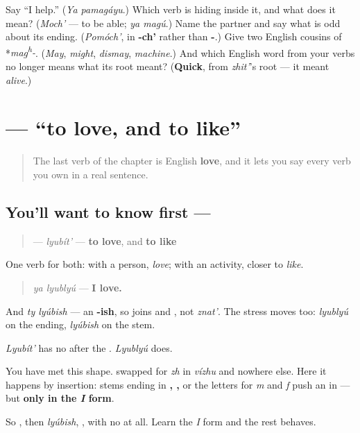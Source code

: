 \begin{tcolorbox}[breakable,colback=teal!4,colframe=teal!35!black,title={Before you move on}]
Say \textquotedblleft{}I help.\textquotedblright{} (\emph{Ya pamagáyu}.) Which verb is hiding inside it, and what does it mean? (\emph{Moch'} — to be able; \emph{ya magú}.) Name the partner and say what is odd about its ending. (\emph{Pomóch'}, in \textbf{-ch'} rather than \textbf{-}.) Give two English cousins of *\emph{mag\textsuperscript{h}-}. (\emph{May}, \emph{might}, \emph{dismay}, \emph{machine}.) And which English word from your verbs no longer means what its root meant? (\textbf{Quick}, from \emph{zhit'}'s root — it meant \emph{alive}.)
\end{tcolorbox}
\section[\texorpdfstring{\ru{любить} (lyubít')}{любить (lyubít')}]{ — \textquotedblleft{}to love, and to like\textquotedblright{}}

\label{lesson:RU-C05-lyubit}



\begin{quote}
The last verb of the chapter is English \textbf{love}, and it lets you say every verb you own in a real sentence.
\end{quote}

\subsection*{You'll want to know first — }
\begin{quote}
\textbf{} — \emph{lyubít'} — \textbf{to love}, and \textbf{to like}
\end{quote}

One verb for both: with a person, \emph{love}; with an activity, closer to \emph{like}.

\begin{quote}
\emph{ya lyublyú} — \textbf{I love.}
\end{quote}

And \emph{ty lyúbish} — an \textbf{-ish}, so \emph{} joins \emph{} and \emph{}, not \emph{znat'}. The stress moves too: \emph{lyublyú} on the ending, \emph{lyúbish} on the stem.

\begin{grammarlens}[title={Grammar Lens: the letter that appears out of nowhere}]
\emph{Lyubít'} has no \textbf{} after the \textbf{}. \emph{Lyublyú} does.

You have met this shape. \textbf{} swapped \textbf{} for \emph{zh} in \emph{vízhu} and nowhere else. Here it happens by insertion: stems ending in \textbf{, , } or the letters for \emph{m} and \emph{f} push an \textbf{} in — but \textbf{only in the \emph{I} form}.

So \textbf{}, then \emph{lyúbish}, \textbf{}, with no \textbf{} at all. Learn the \emph{I} form and the rest behaves.
\end{grammarlens}

